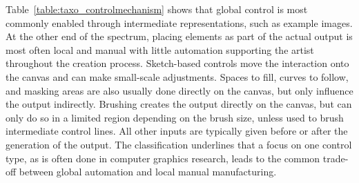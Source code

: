 

Table~\ref{table:taxo_controlmechanism} shows that global control is most commonly enabled through intermediate representations, such as example images. At the other end of the spectrum, placing elements as part of the actual output is most often local and manual with little automation supporting the artist throughout the creation process.  Sketch-based controls move the interaction onto the canvas and can make small-scale adjustments. Spaces to fill, curves to follow, and masking areas are also usually done directly on the canvas, but only influence the output indirectly. Brushing creates the output directly on the canvas, but can only do so in a limited region depending on the brush size, unless used to brush intermediate control lines. All other inputs are typically given before or after the generation of the output. The classification underlines that a focus on one control type, as is often done in computer graphics research, leads to the common trade-off between global automation and local manual manufacturing.

